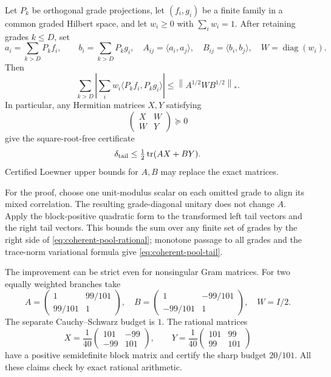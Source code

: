 Let $P_k$ be orthogonal grade projections, let $(f_i,g_i)$ be a finite
family in a common graded Hilbert space, and let $w_i\geq0$ with
$\sum_iw_i=1$. After retaining grades $k\leq D$, set
\[
 a_i=\sum_{k>D}P_kf_i,\qquad b_i=\sum_{k>D}P_kg_i,
 \quad A_{ij}=\langle a_i,a_j\rangle,\quad
 B_{ij}=\langle b_i,b_j\rangle,\quad W=\operatorname{diag}(w_i).
\]
Then
\begin{equation}\label{eq:coherent-pool-tail}
 \sum_{k>D}\left|\sum_iw_i\langle P_kf_i,P_kg_i\rangle\right|
 \leq\left\|A^{1/2}WB^{1/2}\right\|_*.
\end{equation}
In particular, any Hermitian matrices $X,Y$ satisfying
\[
 \begin{pmatrix}X&W\\W&Y\end{pmatrix}\succeq0
\]
give the square-root-free certificate
\begin{equation}\label{eq:coherent-pool-rational}
 \delta_{\rm tail}\leq\tfrac12\operatorname{tr}(AX+BY).
\end{equation}
Certified Loewner upper bounds for $A,B$ may replace the exact matrices.

For the proof, choose one unit-modulus scalar on each omitted grade to
align its mixed correlation. The resulting grade-diagonal unitary does
not change $A$. Apply the block-positive quadratic form to the transformed
left tail vectors and the right tail vectors. This bounds the sum over
any finite set of grades by the right side of
\eqref{eq:coherent-pool-rational}; monotone passage to all grades and the
trace-norm variational formula give \eqref{eq:coherent-pool-tail}.

The improvement can be strict even for nonsingular Gram matrices. For
two equally weighted branches take
\[
 A=\begin{pmatrix}1&99/101\\99/101&1\end{pmatrix},\quad
 B=\begin{pmatrix}1&-99/101\\-99/101&1\end{pmatrix},\quad W=I/2.
\]
The separate Cauchy--Schwarz budget is $1$. The rational matrices
\[
 X=\frac1{40}\begin{pmatrix}101&-99\\-99&101\end{pmatrix},\qquad
 Y=\frac1{40}\begin{pmatrix}101&99\\99&101\end{pmatrix}
\]
have a positive semidefinite block matrix and certify the sharp budget
$20/101$. All these claims check by exact rational arithmetic.


